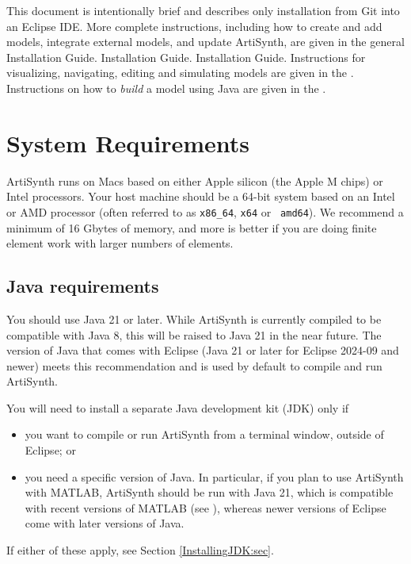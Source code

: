 This document is intentionally brief and describes only installation
from Git into an Eclipse IDE. More complete instructions,
including how to create and add models, integrate external
models, and update ArtiSynth, are given in the general
\ifLinux
{}%
{Installation Guide}.
\fi
\ifWindows
{}%
{Installation Guide}.
\fi
\ifMacOS
{}%
{Installation Guide}.
\fi
Instructions for visualizing, navigating, editing
and simulating models are given in the
.
Instructions on how to {\it build} a model using Java are given in
the .

\section{System Requirements}
\label{SystemRequirements:sec}

\ifMacOS
ArtiSynth runs on Macs based on either Apple silicon (the Apple M
chips) or Intel processors.
\else
Your host machine should be a 64-bit system based on an Intel or AMD
processor (often referred to as {\tt x86\_64}, {\tt x64} or {\tt
amd64}).
\fi
%
We recommend a minimum of 16 Gbytes of memory, and more is better if
you are doing finite element work with larger numbers of elements.

\subsection{Java requirements}
\label{JavaRequirements:sec}

You should use Java 21 or later. While ArtiSynth is currently
compiled to be compatible with Java 8, this will be raised to Java 21
in the near future. The version of Java that comes with Eclipse (Java
21 or later for Eclipse 2024-09 and newer) meets this recommendation and
is used by default to compile and run ArtiSynth.

You will need to install a separate Java development kit (JDK) only if
\begin{itemize}

\item you want to compile or run ArtiSynth from a terminal window,
outside of Eclipse; or

\item you need a specific version of Java. In particular, if you plan
to use ArtiSynth with MATLAB, ArtiSynth should be run with Java 21,
which is compatible with recent versions of MATLAB (see
), whereas
newer versions of Eclipse come with later versions of Java.

\end{itemize}
If either of these apply, see Section \ref{InstallingJDK:sec}.

